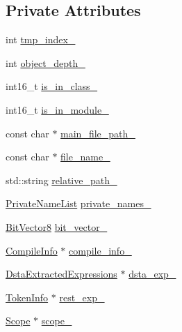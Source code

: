 \subsection*{Private Attributes}
\begin{DoxyCompactItemize}
\item 
int \hyperlink{classmocha_1_1_visitor_info_a9f4d31c6893552b77f92719871334fe6}{tmp\_\-index\_\-}
\item 
int \hyperlink{classmocha_1_1_visitor_info_a59e0dfd3ceee0f62a0fc7a4e766099b7}{object\_\-depth\_\-}
\item 
int16\_\-t \hyperlink{classmocha_1_1_visitor_info_a7a8ce456413d36fd7a00bdb9e1dc6921}{is\_\-in\_\-class\_\-}
\item 
int16\_\-t \hyperlink{classmocha_1_1_visitor_info_a28cd0d4098500b5070101411d191e0c4}{is\_\-in\_\-module\_\-}
\item 
const char $\ast$ \hyperlink{classmocha_1_1_visitor_info_a918cdbf0e9379e84aa2378d5bc0ca8b6}{main\_\-file\_\-path\_\-}
\item 
const char $\ast$ \hyperlink{classmocha_1_1_visitor_info_a4805746226e3c25c280f277cfc4bb37d}{file\_\-name\_\-}
\item 
std::string \hyperlink{classmocha_1_1_visitor_info_a79426cf423bfb3218d5a590fa42717b5}{relative\_\-path\_\-}
\item 
\hyperlink{classmocha_1_1_visitor_info_a04e4999e36bdea0dd35e1b260181bfda}{PrivateNameList} \hyperlink{classmocha_1_1_visitor_info_a16bdccb3ecc68b43a494dd4c86105993}{private\_\-names\_\-}
\item 
\hyperlink{classmocha_1_1_bit_vector}{BitVector8} \hyperlink{classmocha_1_1_visitor_info_a916c8685cff90ee6126bf18f71b9d2ca}{bit\_\-vector\_\-}
\item 
\hyperlink{classmocha_1_1_compile_info}{CompileInfo} $\ast$ \hyperlink{classmocha_1_1_visitor_info_a30b15b6a4c17f03d24275ada6300433e}{compile\_\-info\_\-}
\item 
\hyperlink{classmocha_1_1_dsta_extracted_expressions}{DstaExtractedExpressions} $\ast$ \hyperlink{classmocha_1_1_visitor_info_a967c78fd8536e609808190ef0b56249b}{dsta\_\-exp\_\-}
\item 
\hyperlink{classmocha_1_1_token_info}{TokenInfo} $\ast$ \hyperlink{classmocha_1_1_visitor_info_a67f8de13f71efb7f963da8f04a6ac9bb}{rest\_\-exp\_\-}
\item 
\hyperlink{classmocha_1_1_scope}{Scope} $\ast$ \hyperlink{classmocha_1_1_visitor_info_a7788c3716dc699501e3352801b58e5d9}{scope\_\-}
\item 

\end{DoxyCompactItemize}
